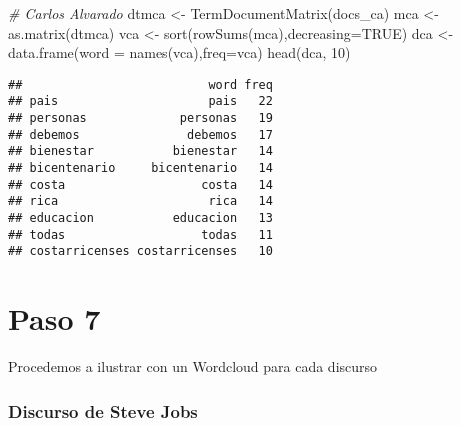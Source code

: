 \documentclass[
]{article}
\newenvironment{Shaded}{\begin{snugshade}}{\end{snugshade}}
\newcommand{\AttributeTok}[1]{\textcolor[rgb]{0.77,0.63,0.00}{#1}}
\newcommand{\CommentTok}[1]{\textcolor[rgb]{0.56,0.35,0.01}{\textit{#1}}}
\newcommand{\ConstantTok}[1]{\textcolor[rgb]{0.00,0.00,0.00}{#1}}
\newcommand{\DecValTok}[1]{\textcolor[rgb]{0.00,0.00,0.81}{#1}}
\newcommand{\FloatTok}[1]{\textcolor[rgb]{0.00,0.00,0.81}{#1}}
\newcommand{\FunctionTok}[1]{\textcolor[rgb]{0.00,0.00,0.00}{#1}}
\newcommand{\NormalTok}[1]{#1}
\newcommand{\OtherTok}[1]{\textcolor[rgb]{0.56,0.35,0.01}{#1}}
\newcommand{\SpecialCharTok}[1]{\textcolor[rgb]{0.00,0.00,0.00}{#1}}
\newcommand{\StringTok}[1]{\textcolor[rgb]{0.31,0.60,0.02}{#1}}
\begin{document}
\begin{Shaded}
\begin{Highlighting}[]
\CommentTok{\# Carlos Alvarado}
\NormalTok{dtmca }\OtherTok{\textless{}{-}} \FunctionTok{TermDocumentMatrix}\NormalTok{(docs\_ca)}
\NormalTok{mca }\OtherTok{\textless{}{-}} \FunctionTok{as.matrix}\NormalTok{(dtmca)}
\NormalTok{vca }\OtherTok{\textless{}{-}} \FunctionTok{sort}\NormalTok{(}\FunctionTok{rowSums}\NormalTok{(mca),}\AttributeTok{decreasing=}\ConstantTok{TRUE}\NormalTok{)}
\NormalTok{dca }\OtherTok{\textless{}{-}} \FunctionTok{data.frame}\NormalTok{(}\AttributeTok{word =} \FunctionTok{names}\NormalTok{(vca),}\AttributeTok{freq=}\NormalTok{vca)}
\FunctionTok{head}\NormalTok{(dca, }\DecValTok{10}\NormalTok{)}
\end{Highlighting}
\end{Shaded}

\begin{verbatim}
##                          word freq
## pais                     pais   22
## personas             personas   19
## debemos               debemos   17
## bienestar           bienestar   14
## bicentenario     bicentenario   14
## costa                   costa   14
## rica                     rica   14
## educacion           educacion   13
## todas                   todas   11
## costarricenses costarricenses   10
\end{verbatim}

\hypertarget{paso-7}{%
\section{Paso 7}\label{paso-7}}

Procedemos a ilustrar con un Wordcloud para cada discurso

\hypertarget{discurso-de-steve-jobs}{%
\subsubsection{Discurso de Steve Jobs}\label{discurso-de-steve-jobs}}

\begin{Shaded}
\end{Shaded}
\end{document}
